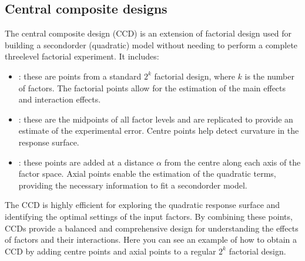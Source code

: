 \documentclass[letterpaper,10pt,english]{jupyterBook}
\begin{document}
\subsection{Central composite designs}
\label{\detokenize{notebooks/design_of_experiments:central-composite-designs}}
\sphinxAtStartPar
The central composite design (CCD) is an extension of factorial design used for building a second\sphinxhyphen{}order (quadratic) model without needing to perform a complete three\sphinxhyphen{}level factorial experiment. It includes:
\begin{itemize}
\item {} 
\sphinxAtStartPar
{}: these are points from a standard \(2^k\) factorial design, where \(k\) is the number of factors. The factorial points allow for the estimation of the main effects and interaction effects.

\item {} 
\sphinxAtStartPar
{}: these are the midpoints of all factor levels and are replicated to provide an estimate of the experimental error. Centre points help detect curvature in the response surface.

\item {} 
\sphinxAtStartPar
{}: these points are added at a distance \(\alpha\) from the centre along each axis of the factor space. Axial points enable the estimation of the quadratic terms, providing the necessary information to fit a second\sphinxhyphen{}order model.

\end{itemize}

\sphinxAtStartPar
The CCD is highly efficient for exploring the quadratic response surface and identifying the optimal settings of the input factors. By combining these points, CCDs provide a balanced and comprehensive design for understanding the effects of factors and their interactions. Here you can see an example of how to obtain a CCD by adding centre points and axial points to a regular \(2^k\) factorial design.
\end{document}
